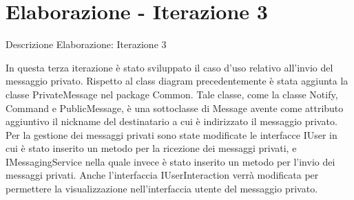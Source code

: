 \section{Elaborazione - Iterazione 3}
\begin{frame} {Descrizione Elaborazione: Iterazione 3}
  \begin{scriptsize}
    In questa terza iterazione è stato sviluppato il caso d'uso relativo all'invio del messaggio privato. Rispetto al class diagram precedentemente è stata aggiunta 
    la classe PrivateMessage nel package Common. Tale classe, come la classe Notify, Command e PublicMessage, è una sottoclasse di Message avente come attributo 
    aggiuntivo il nickname del destinatario a cui è indirizzato il messaggio privato.
    \newline
    Per la gestione dei messaggi privati sono state modificate le interfacce IUser in cui è stato inserito un metodo per la ricezione dei messaggi privati, e   
    IMessagingService nella quale invece è stato inserito un metodo per l'invio dei messaggi privati. Anche l'interfaccia IUserInteraction verrà modificata per 
    permettere la visualizzazione nell'interfaccia utente del messaggio privato.
  \end{scriptsize}
\end{frame}

